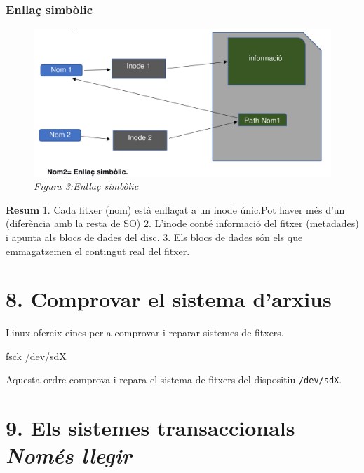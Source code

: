 \documentclass[
  12 pt,
  a4paper,
]{article}
\newenvironment{Shaded}{\begin{snugshade}}{\end{snugshade}}
\newcommand{\ExtensionTok}[1]{#1}
\newcommand{\NormalTok}[1]{#1}
\begin{document}
\subsubsection{Enllaç simbòlic}\label{enllauxe7-simbuxf2lic}

\begin{figure}
\centering
\includegraphics{png/enllaçSimbòlic.png}
\caption{\emph{Figura 3:Enllaç simbòlic}}
\end{figure}

\textbf{Resum} 1. Cada fitxer (nom) està enllaçat a un inode únic.Pot
haver més d'un (diferència amb la resta de SO) 2. L'inode conté
informació del fitxer (metadades) i apunta als blocs de dades del disc.
3. Els blocs de dades són els que emmagatzemen el contingut real del
fitxer.

\section{8. Comprovar el sistema
d'arxius}\label{comprovar-el-sistema-darxius}

Linux ofereix eines per a comprovar i reparar sistemes de fitxers.

\begin{Shaded}
\begin{Highlighting}[]
\ExtensionTok{fsck}\NormalTok{ /dev/sdX}
\end{Highlighting}
\end{Shaded}

Aquesta ordre comprova i repara el sistema de fitxers del dispositiu
\texttt{/dev/sdX}.

\section{\texorpdfstring{9. Els sistemes transaccionals \emph{Només
llegir}}{9. Els sistemes transaccionals Només llegir}}\label{els-sistemes-transaccionals-nomuxe9s-llegir}
\end{document}
